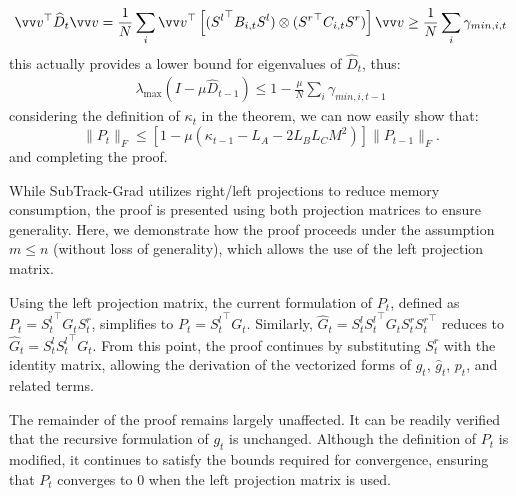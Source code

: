 \begin{equation}
    \vv v^\top \widehat{D}_t \vv v = \frac1N \sum_i \vv v^\top \left[({S^l}^\top B_{i,t} S^l)\otimes({S^r}^\top C_{i,t}S^r)\right]\vv v \ge \frac1N \sum_i \gamma_{min, i,t} 
\end{equation}
this actually provides a lower bound for eigenvalues of \(\widehat{D}_t\), thus:
\begin{eqnarray}
    \lambda_{\max}(I - \mu \widehat{D}_{t-1}) \le 1 - \frac{\mu}{N} \sum_i \gamma_{min, i,t-1}
\end{eqnarray}
considering the definition of \(\kappa_t\) in the theorem, we can now easily show that:
\[
    \|P_t\|_F \leq [1-\mu(\kappa_{t-1} - L_A - 2L_B L_C M^2)]\|P_{t-1}\|_F.
\]
and completing the proof.

While SubTrack-Grad utilizes right/left projections to reduce memory consumption, the proof is presented using both projection matrices to ensure generality. Here, we demonstrate how the proof proceeds under the assumption \( m \leq n \) (without loss of generality), which allows the use of the left projection matrix.

Using the left projection matrix, the current formulation of \( P_t \), defined as \( P_t = {S_t^l}^\top G_t S_t^r \), simplifies to \( P_t = {S_t^l}^\top G_t \). Similarly, \( \widehat{G}_t = S_t^l {S_t^l}^\top G_t S_t^r {S_t^r}^\top \) reduces to \( \widehat{G}_t = S_t^l {S_t^l}^\top G_t \). From this point, the proof continues by substituting \( S_t^r \) with the identity matrix, allowing the derivation of the vectorized forms of \( g_t \), \( \widehat{g}_t \), \( p_t \), and related terms.

The remainder of the proof remains largely unaffected. It can be readily verified that the recursive formulation of \( g_t \) is unchanged. Although the definition of \( P_t \) is modified, it continues to satisfy the bounds required for convergence, ensuring that \( P_t \) converges to 0 when the left projection matrix is used.